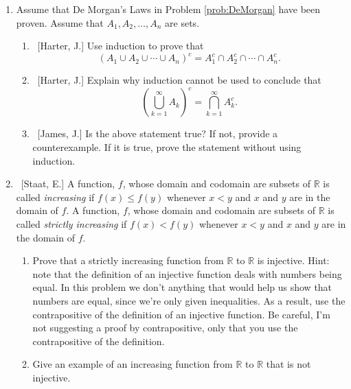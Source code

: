 \documentclass[10pt]{article}
\begin{document}
\begin{enumerate}
\begin{enumerate}
	\end{enumerate}
	
\item  Assume that De Morgan's Laws in Problem \ref{prob:DeMorgan} have been proven.  Assume that $A_1, A_2, \ldots, A_n$ are sets.

	\begin{enumerate}
	
	\item  ~[Harter, J.] Use induction to prove that $$\left( A_1 \cup A_2 \cup \cdots \cup A_n \right)^c = A_1^c \cap A_2^c \cap \cdots \cap A_n^c.$$
	
	\item  ~[Harter, J.] Explain why induction cannot be used to conclude that $$\left( \bigcup_{k=1}^{\infty} A_k \right)^c  = \bigcap_{k=1}^{\infty} A_k^c.$$
	
	\item  ~[James, J.] Is the above statement true?  If not, provide a counterexample.  If it is true, prove the statement without using induction.
	
	\end{enumerate}
	
\newpage
	
\item  ~[Staat, E.]  A function, $f$,  whose domain and codomain are subsets of $\mathbb{R}$ is called \emph{increasing} if $f(x) \leq f(y)$ whenever $x < y$ and $x$ and $y$ are in the domain of $f$.  A function, $f$,  whose domain and codomain are subsets of $\mathbb{R}$ is called \emph{strictly increasing} if $f(x) < f(y)$ whenever $x < y$ and $x$ and $y$ are in the domain of $f$.

	\begin{enumerate}
	
	\item  Prove that a strictly increasing function from $\mathbb{R}$ to $\mathbb{R}$ is injective.  Hint: note that the definition of an injective function deals with numbers being equal.  In this problem we don't anything that would help us show that numbers are equal, since we're only given inequalities.  As a result, use the contrapositive of the definition of an injective function.  Be careful, I'm not suggesting a proof by contrapositive, only that you use the contrapositive of the definition.
	
	\item  Give an example of an increasing function from $\mathbb{R}$ to $\mathbb{R}$ that is not injective.
	

\end{enumerate}
\end{enumerate}
\end{document}
